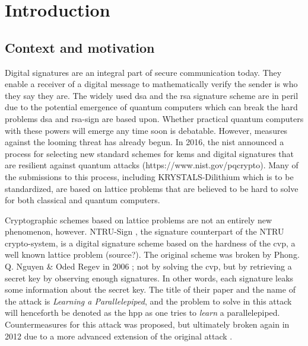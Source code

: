 \newcommand{\PP}[2][]{\mathcal{P}_{#1}(\mat{#2})}
\newcommand{\mat}[1]{\mathbf{#1}}
\renewcommand{\vec}[1]{\mathbf{#1}}
\newcommand{\GLnR}{\mathcal{GL}_{n}(\mathbb{R})}
\newcommand{\normdist}[2]{\mathcal{N}(#1, #2^2)}
\newcommand{\dgdist}{\mathcal{D}_{2\bb{Z}+c, \sigma}}
\newcommand{\bb}[1]{\mathbb{#1}}
\newcommand{\dgd}{\mathcal{D}}
\newcommand{\dgdi}{\widehat{\mathcal{D}}}
\newcommand{\mom}[2]{mom_{#1, \mathbf{#2}}(\mathbf{w})}

\chapter{Introduction}
\section{Context and motivation}
Digital signatures are an integral part of secure communication today. They enable a receiver of a digital message to mathematically verify the sender is who they say they are. 
The widely used \gls{dsa} and the \gls{rsa} 
signature scheme are in peril due to the potential emergence of quantum computers which can break the hard problems \gls{dsa} and \gls{rsa}-sign are based upon.
Whether practical quantum computers with these powers will emerge any time soon is debatable. However, measures against the looming threat has already begun. 
In 2016, the \gls{nist} announced a process for selecting new standard schemes for \gls{kems} and 
digital signatures that are resilient against quantum attacks (https://www.nist.gov/pqcrypto). Many of the submissions to this process, including KRYSTALS-Dilithium which is to be standardized, 
are based on lattice problems that are believed to be hard to solve for both classical and quantum computers.

Cryptographic schemes based on lattice problems are not an entirely new phenomenon, however. NTRU-Sign \cite{NTRUSign03}, the signature counterpart of the NTRU crypto-system,
is a digital signature scheme based on the hardness of the \gls{cvp}, a well known lattice problem (source?).
The original scheme was broken by Phong. Q. Nguyen \& Oded Regev in 2006 \cite{NR09}; not by solving the \gls{cvp}, but by retrieving a secret key by observing enough signatures.
In other words, each signature leaks some information about the secret key.
The title of their paper and the name of the attack is \textit{Learning a Parallelepiped}, and the problem to solve in this attack will henceforth be denoted as the \gls{hpp} as one tries to \textit{learn} a parallelepiped.
Countermeasures for this attack was proposed, but ultimately broken again in 2012 due to a more advanced extension of the original attack \cite{Zonotope12}.

